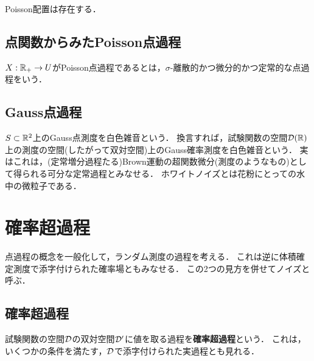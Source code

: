\documentclass[uplatex,dvipdfmx]{jsreport}
\begin{document}
\begin{theorem}[Poisson点過程の存在]
    Poisson配置は存在する．
\end{theorem}

\subsection{点関数からみたPoisson点過程}

\begin{definition}
    $X:\mathbb{R}_+\to U$がPoisson点過程であるとは，$\sigma$-離散的かつ微分的かつ定常的な点過程をいう．
\end{definition}

\subsection{Gauss点過程}

\begin{tcolorbox}[colframe=ForestGreen, colback=ForestGreen!10!white,breakable,colbacktitle=ForestGreen!40!white,coltitle=black,fonttitle=\bfseries\sffamily,
title=]
    $S\subset\mathbb{R}^2$上のGauss点測度を白色雑音という．
    換言すれば，試験関数の空間$\mathcal{D}(\mathbb{R})$上の測度の空間(したがって双対空間)上のGauss確率測度を白色雑音という．
    実はこれは，(定常増分過程たる)Brown運動の超関数微分(測度のようなもの)として得られる可分な定常過程とみなせる．
    ホワイトノイズとは花粉にとっての水中の微粒子である．
\end{tcolorbox}

\section{確率超過程}

\begin{tcolorbox}[colframe=ForestGreen, colback=ForestGreen!10!white,breakable,colbacktitle=ForestGreen!40!white,coltitle=black,fonttitle=\bfseries\sffamily,
title=]
    点過程の概念を一般化して，ランダム測度の過程を考える．
    これは逆に体積確定測度で添字付けられた確率場ともみなせる．
    この2つの見方を併せてノイズと呼ぶ．
\end{tcolorbox}

\subsection{確率超過程}

\begin{tcolorbox}[colframe=ForestGreen, colback=ForestGreen!10!white,breakable,colbacktitle=ForestGreen!40!white,coltitle=black,fonttitle=\bfseries\sffamily,
title=]
    試験関数の空間$\mathcal{D}$の双対空間$\mathcal{D}'$に値を取る過程を\textbf{確率超過程}という．
    これは，いくつかの条件を満たす，$\mathcal{D}$で添字付けられた実過程とも見れる．
\end{tcolorbox}
\end{document}
